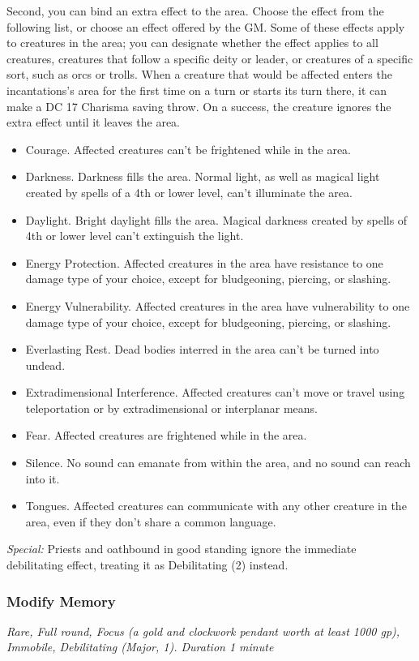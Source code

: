 Second, you can bind an extra effect to the area. Choose the effect from the following list, or choose an effect offered by the GM. Some of these effects apply to creatures in the area; you can designate whether the effect applies to all creatures, creatures that follow a specific deity or leader, or creatures of a specific sort, such as orcs or trolls. When a creature that would be affected enters the incantations's area for the first time on a turn or starts its turn there, it can make a DC 17 Charisma saving throw. On a success, the creature ignores the extra effect until it leaves the area.
\begin{itemize}
\item Courage. Affected creatures can't be frightened while in the area.
\item Darkness. Darkness fills the area. Normal light, as well as magical light created by spells of a 4th or lower level, can't illuminate the area.
\item Daylight. Bright daylight fills the area. Magical darkness created by spells of 4th or lower level can't extinguish the light.
\item Energy Protection. Affected creatures in the area have resistance to one damage type of your choice, except for bludgeoning, piercing, or slashing.
\item Energy Vulnerability. Affected creatures in the area have vulnerability to one damage type of your choice, except for bludgeoning, piercing, or slashing.
\item Everlasting Rest. Dead bodies interred in the area can't be turned into undead.
\item Extradimensional Interference. Affected creatures can't move or travel using teleportation or by extradimensional or interplanar means.
\item Fear. Affected creatures are frightened while in the area.
\item Silence. No sound can emanate from within the area, and no sound can reach into it.
\item Tongues. Affected creatures can communicate with any other creature in the area, even if they don't share a common language.
\end{itemize}

\textit{Special:} Priests and oathbound in good standing ignore the immediate debilitating effect, treating it as Debilitating (2) instead.

\subsubsection{Modify Memory}
\textit{Rare, Full round, Focus (a gold and clockwork pendant worth at least 1000 gp), Immobile, Debilitating (Major, 1). Duration 1 minute}

